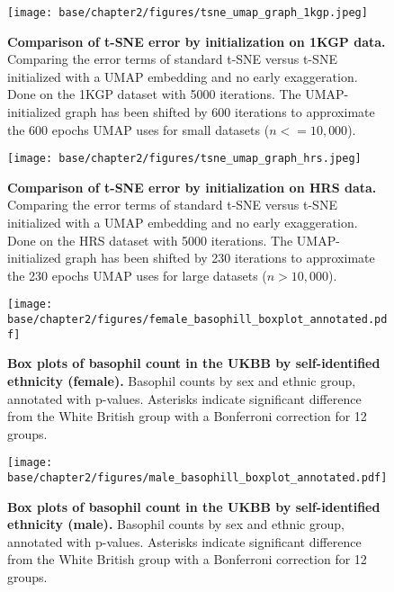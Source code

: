 \begin{figure}[!htb]
    \centering
    \texttt{[image: base/chapter2/figures/tsne\_umap\_graph\_1kgp.jpeg]}
    \caption[Comparison of t-SNE error by initialization on 1KGP data]{\textbf{Comparison of t-SNE error by initialization on 1KGP data.} Comparing the error terms of standard t-SNE versus t-SNE initialized with a UMAP embedding and no early exaggeration. Done on the 1KGP dataset with 5000 iterations. The UMAP-initialized graph has been shifted by 600 iterations to approximate the 600 epochs UMAP uses for small datasets ($n<=10,000$).}
    \label{fig:supp_tsne_umap_compare_1kgp_graph}
\end{figure}

\newpage

\begin{figure}[!htb]
    \centering
    \texttt{[image: base/chapter2/figures/tsne\_umap\_graph\_hrs.jpeg]}
    \caption[Comparison of t-SNE error by initialization on HRS data]{\textbf{Comparison of t-SNE error by initialization on HRS data.} Comparing the error terms of standard t-SNE versus t-SNE initialized with a UMAP embedding and no early exaggeration. Done on the HRS dataset with 5000 iterations. The UMAP-initialized graph has been shifted by 230 iterations to approximate the 230 epochs UMAP uses for large datasets ($n>10,000$).}
    \label{fig:supp_tsne_umap_compare_hrs_graph}
\end{figure}

\newpage

\begin{figure}[ht]
    \centering
    \texttt{[image: base/chapter2/figures/female\_basophill\_boxplot\_annotated.pdf]}
    \caption[Box plots of basophil count in the UKBB by self-identified ethnicity (female)]{\textbf{Box plots of basophil count in the UKBB by self-identified ethnicity (female).} Basophil counts by sex and ethnic group, annotated with p-values. Asterisks indicate significant difference from the White British group with a Bonferroni correction for 12 groups.}
    \label{fig:supp_box_basophill_f}
\end{figure}

\newpage

\begin{figure}[ht]
    \centering
    \texttt{[image: base/chapter2/figures/male\_basophill\_boxplot\_annotated.pdf]}
    \caption[Box plots of basophil count in the UKBB by self-identified ethnicity (male)]{\textbf{Box plots of basophil count in the UKBB by self-identified ethnicity (male).} Basophil counts by sex and ethnic group, annotated with p-values. Asterisks indicate significant difference from the White British group with a Bonferroni correction for 12 groups.}
    \label{fig:supp_box_basophill_m}
\end{figure}

